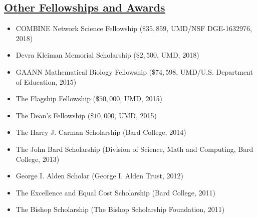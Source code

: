 \documentclass[]{res}
\begin{document}
\begin{resume}
   \section{\underline{Other Fellowships and Awards}} %
\begin{itemize}[leftmargin=*]
\item[] COMBINE Network Science Fellowship ($\$35,859$, UMD/NSF DGE-1632976, 2018)
\item[] Devra Kleiman Memorial Scholarship ($\$2,500$, UMD, 2018)
\item[] GAANN Mathematical Biology Fellowship ($\$74,598$, UMD/U.S. Department of Education, 2015)
\item[] The Flagship Fellowship ($\$50,000$, UMD, 2015)
\item[] The Dean's Fellowship ($\$10,000$, UMD, 2015)
\item[] The Harry J. Carman Scholarship (Bard College, 2014)
\item[] The John Bard Scholarship (Division of Science, Math and Computing, Bard College, 2013)
\item[] George I. Alden Scholar (George I. Alden Trust, 2012)%
\item[] The Excellence and Equal Cost Scholarship (Bard College, 2011) 
\item[] The Bishop Scholarship (The Bishop Scholarship Foundation, 2011)
\end{itemize}
  

\end{resume}
\end{document}
